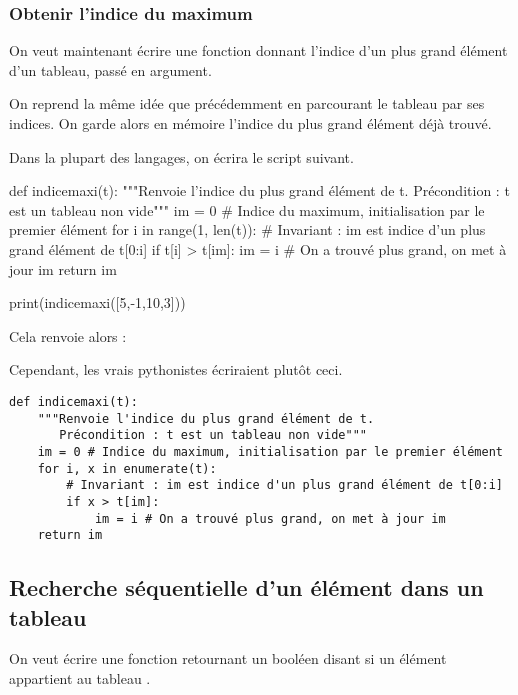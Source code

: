 \subsubsection{Obtenir l'indice du maximum}
On veut maintenant écrire une fonction  donnant l'indice d'un plus grand élément d'un tableau, passé en argument.

On reprend la même idée que précédemment en parcourant le tableau par ses indices. On garde alors 
en mémoire l'indice du plus grand élément déjà trouvé.

Dans la plupart des langages, on écrira le script suivant.
\begin{pyverbatim}
def indicemaxi(t):
    """Renvoie l'indice du plus grand élément de t.
       Précondition : t est un tableau non vide"""
    im = 0 # Indice du maximum, initialisation par le premier élément
    for i in range(1, len(t)):
        # Invariant : im est indice d'un plus grand élément de t[0:i]
        if t[i] > t[im]:
            im = i # On a trouvé plus grand, on met à jour im
    return im
    
print(indicemaxi([5,-1,10,3]))
\end{pyverbatim}

Cela renvoie alors :
\begin{quote}
  \printpythontex[verb]
\end{quote}

Cependant, les vrais pythonistes écriraient plutôt ceci. 
\begin{lstlisting}
def indicemaxi(t):
    """Renvoie l'indice du plus grand élément de t.
       Précondition : t est un tableau non vide"""
    im = 0 # Indice du maximum, initialisation par le premier élément
    for i, x in enumerate(t):
        # Invariant : im est indice d'un plus grand élément de t[0:i]
        if x > t[im]:
            im = i # On a trouvé plus grand, on met à jour im
    return im
\end{lstlisting}

\subsection{Recherche séquentielle d'un élément dans un tableau}

On veut écrire une fonction  retournant un booléen disant si un
élément  appartient au tableau . 

